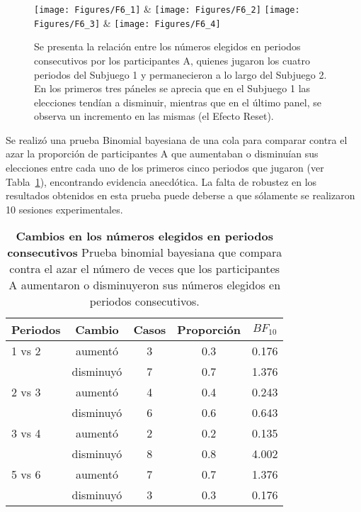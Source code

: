 \begin{figure}[h]
\centering
\texttt{[image: Figures/F6\_1]} & \texttt{[image: Figures/F6\_2]} 
\texttt{[image: Figures/F6\_3]} & \texttt{[image: Figures/F6\_4]} 
\decoRule
\caption[Elecciones registradas en ensayos consecutivos]{Se presenta la relación entre los números elegidos en periodos consecutivos por los participantes A, quienes jugaron los cuatro periodos del Subjuego 1 y permanecieron a lo largo del Subjuego 2. En los primeros tres páneles se aprecia que en el Subjuego 1 las elecciones tendían a disminuir, mientras que en el último panel, se observa un incremento en las mismas (el Efecto Reset).}
\label{fig:Reset_cambios}
\end{figure}

Se realizó una prueba Binomial bayesiana de una cola para comparar contra el azar la proporción de participantes A que aumentaban o disminuían sus elecciones entre cada uno de los primeros cinco periodos que jugaron (ver Tabla~\ref{Binom_Reset}), encontrando evidencia anecdótica. La falta de robustez en los resultados obtenidos en esta prueba puede deberse a que sólamente se realizaron 10 sesiones experimentales.\\

\begin{table}[h]
\caption[Prueba binomial bayesiana para evaluar la proporción de casos en que los participantes A aumentan y reducen su número elegido]{\textbf{Cambios en los números elegidos en periodos consecutivos} Prueba binomial bayesiana que compara contra el azar el número de veces que los participantes A aumentaron o disminuyeron sus números elegidos en periodos consecutivos.}
\label{Binom_Reset}
\centering
\begin{tabular}{l c | c c | c}
\toprule
\textbf{Periodos} & \textbf{Cambio} & \textbf{Casos} & \textbf{Proporción} & \textbf{$BF_{10}$}\\
\midrule
1 vs 2 & aumentó & 3 & 0.3 & 0.176\\
       & disminuyó & 7 & 0.7 & 1.376\\
2 vs 3 & aumentó & 4 & 0.4 & 0.243\\
       & disminuyó & 6 & 0.6 & 0.643\\
3 vs 4 & aumentó & 2 & 0.2 & 0.135\\
       & disminuyó & 8 & 0.8 & 4.002\\
5 vs 6 & aumentó & 7 & 0.7 & 1.376\\
       & disminuyó & 3 & 0.3 & 0.176\\
\bottomrule
\end{tabular}
\end{table}

